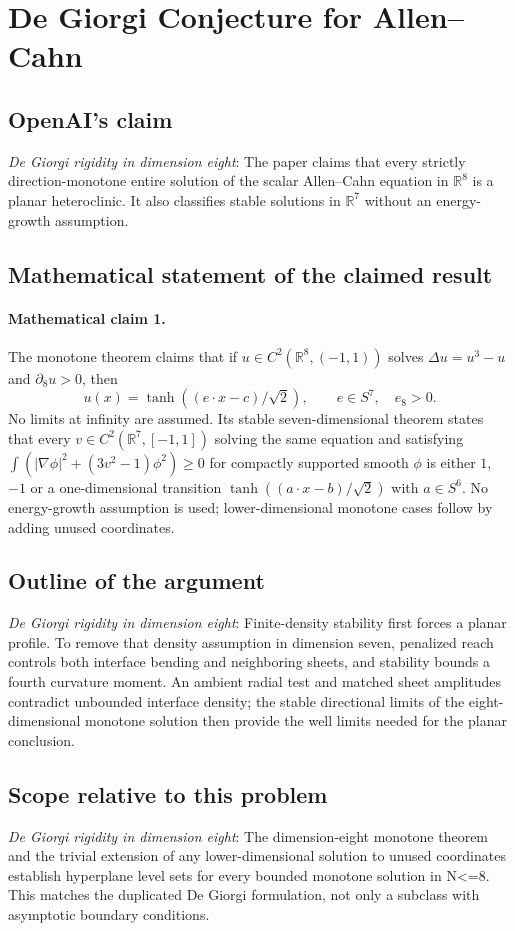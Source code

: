 \documentclass[11pt]{article}
\begin{document}
\section*{De Giorgi Conjecture for Allen–Cahn}

\subsection{OpenAI's claim}
\textit{De Giorgi rigidity in dimension eight}: The paper claims that every strictly direction-monotone entire solution of the scalar Allen--Cahn equation in $\mathbb R^8$ is a planar heteroclinic. It also classifies stable solutions in $\mathbb R^7$ without an energy-growth assumption.

\subsection{Mathematical statement of the claimed result}
\paragraph{Mathematical claim 1.} The monotone theorem claims that if $u\in C^2(\mathbb R^8,(-1,1))$ solves $\Delta u=u^3-u$ and $\partial_8u>0$, then \[u(x)=\tanh((e\cdot x-c)/\sqrt2),\qquad e\in S^7,\quad e_8>0.\] No limits at infinity are assumed. Its stable seven-dimensional theorem states that every $v\in C^2(\mathbb R^7,[-1,1])$ solving the same equation and satisfying $\int(|\nabla\phi|^2+(3v^2-1)\phi^2)\ge0$ for compactly supported smooth $\phi$ is either $1$, $-1$ or a one-dimensional transition $\tanh((a\cdot x-b)/\sqrt2)$ with $a\in S^6$. No energy-growth assumption is used; lower-dimensional monotone cases follow by adding unused coordinates.

\subsection{Outline of the argument}
\textit{De Giorgi rigidity in dimension eight}: Finite-density stability first forces a planar profile. To remove that density assumption in dimension seven, penalized reach controls both interface bending and neighboring sheets, and stability bounds a fourth curvature moment. An ambient radial test and matched sheet amplitudes contradict unbounded interface density; the stable directional limits of the eight-dimensional monotone solution then provide the well limits needed for the planar conclusion.

\subsection{Scope relative to this problem}
\textit{De Giorgi rigidity in dimension eight}: The dimension-eight monotone theorem and the trivial extension of any lower-dimensional solution to unused coordinates establish hyperplane level sets for every bounded monotone solution in N<=8. This matches the duplicated De Giorgi formulation, not only a subclass with asymptotic boundary conditions.
\end{document}
